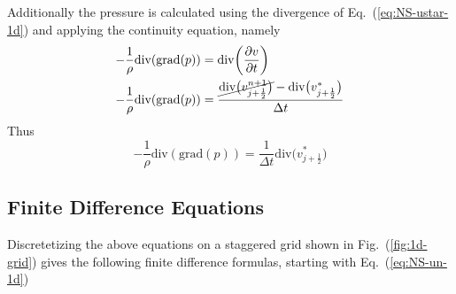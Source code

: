 Additionally the pressure is calculated using the divergence of
Eq.~(\ref{eq:NS-ustar-1d}) and applying the continuity equation, namely  
\begin{subequations}
    \begin{align}
        -\frac{1}{\rho} \text{div}(\text{grad}(p)) & =
                \text{div}\bigg(\pdv{v}{t}\bigg)        \\
        -\frac{1}{\rho} \text{div}(\text{grad}(p)) & =
            \frac{
                    \cancel{\text{div}\big(v^{n+1}_{j+\frac{1}{2}}\big)} -
                    \text{div}\big(v^{\ast}_{j+\frac{1}{2}}\big)
                }
                {\Delta t}
    \end{align}
\end{subequations}
Thus
\begin{equation}
    -\frac{1}{\rho} \text{div}(\text{grad}(p)) =
        \frac{1}{\Delta t} \text{div} \big(v^{\ast}_{j+\frac{1}{2}}\big)
\end{equation}
\newpage
\subsection{Finite Difference Equations}
Discretetizing the above equations on a staggered grid shown in
Fig.~(\ref{fig:1d-grid}) gives the following finite difference formulas,
starting with Eq.~(\ref{eq:NS-un-1d})


